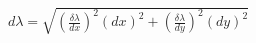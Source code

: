 \documentclass{standalone}
\begin{document}
    $d\lambda = \sqrt{(\frac{\delta\lambda}{dx})^2 (dx)^2 + (\frac{\delta\lambda}{dy})^2 (dy)^2}$
\end{document}
